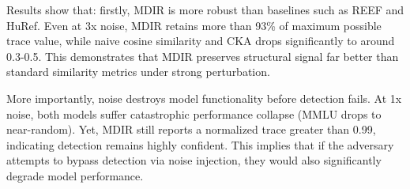 \documentclass{article} %
\begin{document}
Results show that: firstly, MDIR is more robust than baselines such as REEF and HuRef. Even at 3x noise, MDIR retains more than 93\% of maximum possible trace value, while naive cosine similarity and CKA drops significantly to around 0.3-0.5. This demonstrates that MDIR preserves structural signal far better than standard similarity metrics under strong perturbation.

More importantly, noise destroys model functionality before detection fails. At 1x noise, both models suffer catastrophic performance collapse (MMLU drops to near-random). Yet, MDIR still reports a normalized trace greater than 0.99, indicating detection remains highly confident. This implies that if the adversary attempts to bypass detection via noise injection, they would also significantly degrade model performance.
\end{document}
